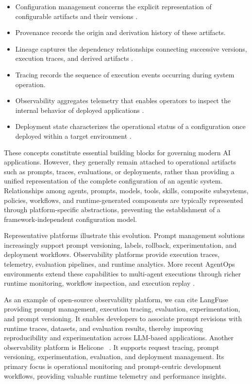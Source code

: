 \documentclass[10pt]{article}
\begin{document}
\begin{itemize}
	\item Configuration management concerns the explicit representation of configurable artifacts and their versions \cite{liu2025towards, Hughes03072025, langfusedocs, heliconedocs}. 
	\item Provenance records the origin and derivation history of these artifacts.
	\item Lineage captures the dependency relationships connecting successive versions, execution traces, and derived artifacts \cite{cesarano2026grand, rajath2025review}. 
	\item Tracing records the sequence of execution events occurring during system operation.
	\item Observability \cite{langsmithdocs} aggregates telemetry that enables operators to inspect the internal behavior of deployed applications \cite{opentelemetry}. 
	\item Deployment state characterizes the operational status of a configuration once deployed within a target environment \cite{braintrustdocs}.
\end{itemize}	

These concepts constitute essential building blocks for governing modern AI applications. However, they generally remain attached to operational artifacts such as prompts, traces, evaluations, or deployments, rather than providing a unified representation of the complete configuration of an agentic system. Relationships among agents, prompts, models, tools, skills, composite subsystems, policies, workflows, and runtime-generated components are typically represented through platform-specific abstractions, preventing the establishment of a framework-independent configuration model.

Representative platforms illustrate this evolution. Prompt management solutions increasingly support prompt versioning, labels, rollback, experimentation, and deployment workflows. Observability platforms provide execution traces, telemetry, evaluation pipelines, and runtime analytics. More recent AgentOps environments extend these capabilities to multi-agent executions through richer runtime monitoring, workflow inspection, and execution replay \cite{sahir2026agentops}. 

As an example of open-source observability platform, we can cite LangFuse~\cite{langfusedocs} providing prompt management, execution tracing, evaluation, experimentation, and prompt versioning. It enables developers to associate prompt revisions with runtime traces, datasets, and evaluation results, thereby improving reproducibility and experimentation across LLM-based applications. 
Another observability platform is Helicone ~\cite{heliconedocs}. It supports request tracing, prompt versioning, experimentation, evaluation, and deployment management. Its primary focus is operational monitoring and prompt-centric development workflows, providing valuable runtime telemetry and performance insights. 
\end{document}
